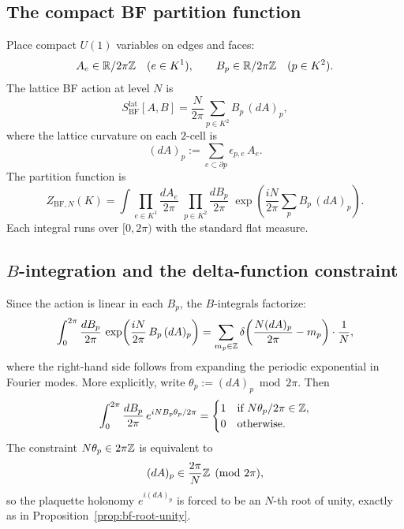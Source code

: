 \subsection{The compact BF partition function}

Place compact $U(1)$ variables on edges and faces:
\begin{equation}\label{eq:appD-variables}
A_e\in\mathbb{R}/2\pi\mathbb{Z}\quad(e\in K^1),\qquad B_p\in\mathbb{R}/2\pi\mathbb{Z}\quad(p\in K^2).
\end{equation}
The lattice BF action at level $N$ is
\begin{equation}\label{eq:appD-lattice-action}
S_{\mathrm{BF}}^{\mathrm{lat}}[A,B]=\frac{N}{2\pi}\sum_{p\in K^2}B_p\,(dA)_p,
\end{equation}
where the lattice curvature on each $2$-cell is
\begin{equation}\label{eq:appD-lattice-curvature}
(dA)_p:=\sum_{e\subset\partial p}\epsilon_{p,e}\,A_e.
\end{equation}
The partition function is
\begin{equation}\label{eq:appD-Z-BF-start}
Z_{\mathrm{BF},N}(K)=\int\prod_{e\in K^1}\frac{dA_e}{2\pi}\;\prod_{p\in K^2}\frac{dB_p}{2\pi}\;\exp\!\left(\frac{iN}{2\pi}\sum_{p}B_p\,(dA)_p\right).
\end{equation}
Each integral runs over $[0,2\pi)$ with the standard flat measure.

\subsection{\texorpdfstring{$B$}{B}-integration and the delta-function constraint}

Since the action is linear in each $B_p$, the $B$-integrals factorize:
\begin{equation}\label{eq:appD-B-integral}
\int_0^{2\pi}\frac{dB_p}{2\pi}\,\exp\!\left(\frac{iN}{2\pi}\,B_p\,(dA)_p\right)
=\sum_{m_p\in\mathbb{Z}}\delta\!\left(\frac{N(dA)_p}{2\pi}-m_p\right)\cdot\frac{1}{N},
\end{equation}
where the right-hand side follows from expanding the periodic exponential in Fourier modes. More explicitly, write $\theta_p:=(dA)_p\bmod 2\pi$. Then
\begin{equation}\label{eq:appD-fourier-expansion}
\int_0^{2\pi}\frac{dB_p}{2\pi}\,e^{iNB_p\theta_p/2\pi}=\begin{cases}1&\text{if }N\theta_p/2\pi\in\mathbb{Z},\\0&\text{otherwise.}\end{cases}
\end{equation}
The constraint $N\theta_p\in 2\pi\mathbb{Z}$ is equivalent to
\begin{equation}\label{eq:appD-constraint}
(dA)_p\in\frac{2\pi}{N}\mathbb{Z}\pmod{2\pi},
\end{equation}
so the plaquette holonomy $e^{i(dA)_p}$ is forced to be an $N$-th root of unity, exactly as in Proposition~\ref{prop:bf-root-unity}.

